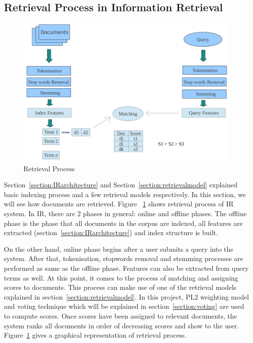 \subsection{Retrieval Process in Information Retrieval}\label{section:retrieving}
\begin{figure}
\centering
\includegraphics[scale=0.3]{./figures/retrieval.png}
\caption{Retrieval Process} \label{fig:retrieval} 
\end{figure}
Section~\ref{section:IRarchitecture} and Section~\ref{section:retrievalmodel} explained basic indexing process and a few retrieval models respectively.
In this section, we will see how documents are retrieved. Figure ~\ref{fig:retrieval} shows
retrieval process of IR system. In IR, there are 2 phases in general:
online and offline phases. The offline phase is the phase that all documents in the corpus are indexed, all features are extracted 
(section~\ref{section:IRarchitecture}) and index structure is built. 


On the other hand, online phase begins after a user submits a query into the system. After that, tokenisation, stopwords removal and stemming processes 
are performed as same as the offline phase.
Features can also be extracted from query terms as well. At this point, it comes to the process of matching and assigning scores to documents.
This process can make use of one of the retrieval models explained in section~\ref{section:retrievalmodel}. In this project, PL2 weighting model and voting
technique which will be explained in section~\ref{section:voting} are used to compute scores.
Once scores have been assigned to relevant documents, the system ranks all documents in order of decreasing scores and 
show to the user. Figure~\ref{fig:retrieval} gives a graphical representation of retrieval process.

